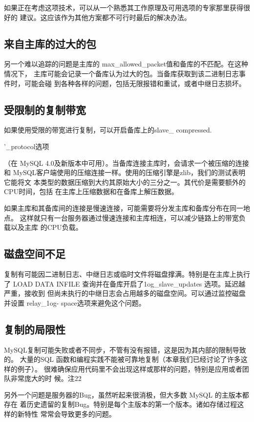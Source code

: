 如果正在考虑这项技术，可以从一个熟悉其工作原理及可用选项的专家那里获得很好的
建议。这应该作为其他方案都不可行时最后的解决办法。

\subsection{来自主库的过大的包}
另一个难以追踪的问题是主库的 max\_allowed\_packet值和备库的不匹配。在这种情况下，
主库可能会记录一个备库认为过大的包。当备库获取到该二进制日志事件时，可能会碰
到各种各样的问题，包括无限报错和重试，或者中继日志损坏。

\subsection{受限制的复制带宽}
如果使用受限的带宽进行复制，可以开启备库上的slave\_ compressed.

'\_protocol选项

（在 MySQL 4.0及新版本中可用）。当备库连接主库时，会请求一个被压缩的连接和
MySQL客户端使用的压缩连接一样。使用的压缩引擎是zlib，我们的测试表明它能将文
本类型的数据压缩到大约其原始大小的三分之一。其代价是需要额外的CPU时间，包括
在主库上压缩数据和在备库上解压数据。

如果主库和其备库间的连接是慢速连接，可能需要将分发主库和备库分布在同一地点。
这样就只有一台服务器通过慢速连接和主库相连，可以减少链路上的带宽负载以及主库
的CPU负载。

\subsection{磁盘空间不足}
复制有可能因二进制日志、中继日志或临时文件将磁盘撑满。特别是在主库上执行了
LOAD DATA INFILE 查询并在备库开启了1og\_slave\_updates 选项。延迟越严重，接收到
但尚未执行的中继日志会占用越多的磁盘空间。可以通过监控磁盘并设置 relay\_1og-
space选项来避免这个问题。

\subsection{复制的局限性}
MySQL复制可能失败或者不同步，不管有没有报错，这是因为其内部的限制导致的。
大量的SQL 函数和编程实践不能被可靠地复制（本章我们已经讨论了许多这样的例子）。
很难确保应用代码里不会出现这样或那样的问题，特别是应用或者团队非常庞大的时
候。注22

另外一个问题是服务器的Bug，虽然听起来很消极，但大多数 MySQL 的主版本都存在
着历史遗留的复制Bug。特别是每个主版本的第一个版本。诸如存储过程这样的新特性
常常会导致更多的问题。

